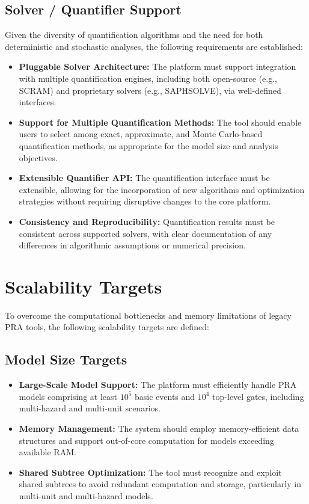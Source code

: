 \subsection{Solver / Quantifier Support}
\label{subsec:solver-support}

Given the diversity of quantification algorithms and the need for both deterministic and stochastic analyses, the following requirements are established:

\begin{itemize}
    \item \textbf{Pluggable Solver Architecture:} The platform must support integration with multiple quantification engines, including both open-source (e.g., SCRAM) and proprietary solvers (e.g., SAPHSOLVE), via well-defined interfaces.
    \item \textbf{Support for Multiple Quantification Methods:} The tool should enable users to select among exact, approximate, and Monte Carlo-based quantification methods, as appropriate for the model size and analysis objectives.
    \item \textbf{Extensible Quantifier API:} The quantification interface must be extensible, allowing for the incorporation of new algorithms and optimization strategies without requiring disruptive changes to the core platform.
    \item \textbf{Consistency and Reproducibility:} Quantification results must be consistent across supported solvers, with clear documentation of any differences in algorithmic assumptions or numerical precision.
\end{itemize}

\section{Scalability Targets}
\label{sec:scalability-targets}

To overcome the computational bottlenecks and memory limitations of legacy PRA tools, the following scalability targets are defined:

\subsection{Model Size Targets}
\label{subsec:model-size-targets}

\begin{itemize}
    \item \textbf{Large-Scale Model Support:} The platform must efficiently handle PRA models comprising at least $10^5$ basic events and $10^4$ top-level gates, including multi-hazard and multi-unit scenarios.
    \item \textbf{Memory Management:} The system should employ memory-efficient data structures and support out-of-core computation for models exceeding available RAM.
    \item \textbf{Shared Subtree Optimization:} The tool must recognize and exploit shared subtrees to avoid redundant computation and storage, particularly in multi-unit and multi-hazard models.
\end{itemize}

